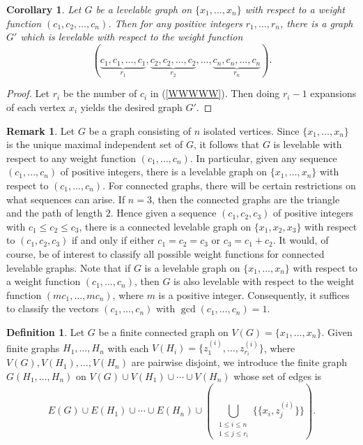 \documentclass[12pt]{amsart}
\numberwithin{equation}{section}
\newtheorem{corollary}[theorem]{Corollary}
\theoremstyle{definition}
\newtheorem{definition}[theorem]{Definition}
\newtheorem{remark}[theorem]{Remark}
\newcounter{i} %
\begin{document}
\begin{corollary}
    Let $G$ be a levelable graph on $\{x_1, \ldots, x_n\}$ with respect to a weight function $(c_1, c_2, \ldots, c_n)$.  Then for any positive
    integers $r_1,\ldots,r_n$, there is a graph $G'$ which is levelable with respect to the weight function 
    \begin{equation}
    \label{WWWWW}
    (\underbrace{c_1, c_1, \ldots, c_1}_{r_1}, 
    \underbrace{c_2, c_2, \ldots, c_2}_{r_2}, 
    \ldots, 
    \underbrace{c_n, c_n, \ldots, c_n}_{r_n}). 
        \end{equation}
\end{corollary}

\begin{proof}
Let $r_i$ be the number of $c_i$ in (\ref{WWWWW}).  Then doing
$r_i -1$ expansions of each vertex $x_i$ 
yields the desired graph $G'$.   
\end{proof}




\begin{remark}
Let $G$ be a graph consisting of $n$ isolated vertices.  Since $\{x_1, \ldots, x_n\}$ is the unique maximal independent set of $G$, it follows that $G$ is levelable with respect to any weight function $(c_1, \ldots, c_n)$.  In particular, given any sequence $(c_1, \ldots, c_n)$ of positive integers, there is a levelable graph on $\{x_1, \ldots, x_n\}$ with respect to $(c_1, \ldots, c_n)$. For connected graphs, there will be certain restrictions on what
sequences can arise. If $n=3$, then the connected graphs are the triangle and the path of length $2$.  Hence given a sequence $(c_1, c_2, c_3)$ of positive integers with $c_1 \leq c_2 \leq c_3$, there is a connected levelable graph on $\{x_1, x_2, x_3\}$ with respect to $(c_1, c_2, c_3)$ if and only if either $c_1=c_2=c_3$ or $c_3 = c_1 + c_2$.  It would, of course, be of interest to classify all possible weight functions for connected levelable graphs. Note that if $G$ is a levelable graph  on $\{x_1, \ldots, x_n\}$ with respect to a weight function $(c_1, \ldots, c_n)$, then $G$ is also levelable with respect to the weight function $(mc_1, \ldots, mc_n)$, where $m$ is a positive integer. Consequently, it suffices to classify the vectors $(c_1,\dots,c_n)$ with $\gcd(c_1,\dots,c_n)=1$.
\end{remark}

\begin{definition}
\label{defGH}
Let $G$ be a finite connected graph on $V(G) = \{x_1, \ldots, x_n\}$.  Given finite graphs $H_1,\ldots, H_n$ with each $V(H_i) = \{z^{(i)}_1, \ldots, z^{(i)}_{r_i} \}$, where $V(G), V(H_1), \ldots, V(H_n)$ are pairwise disjoint, we introduce the finite graph $G(H_1, \ldots, H_n)$ on $V(G) \cup V(H_1) \cup \cdots \cup V(H_n)$ whose set of edges is
\[
E(G) \cup E(H_1) \cup \cdots \cup E(H_n) \cup \left(\,\bigcup_{\substack{1 \leq i \leq n \\ 1 \leq j \leq r_i}}\{\{x_i, z^{(i)}_j \}\}\right).
\] 
\end{definition}
\end{document}
